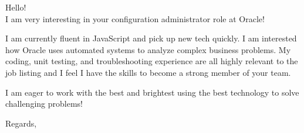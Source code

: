 \documentclass[12pt]{letter}
\begin{document}
\begin{letter}

Hello!\\

I am very interesting in your configuration administrator role at Oracle!

I am currently fluent in JavaScript and pick up new tech quickly.  I am interested how Oracle uses automated systems to analyze complex business problems.  My coding, unit testing, and troubleshooting experience are all highly relevant to the job listing and I feel I have the skills to become a strong member of your team.

I am eager to work with the best and brightest using the best technology to solve challenging problems!
\\
\closing{Regards,}
\end{letter}
\end{document}
